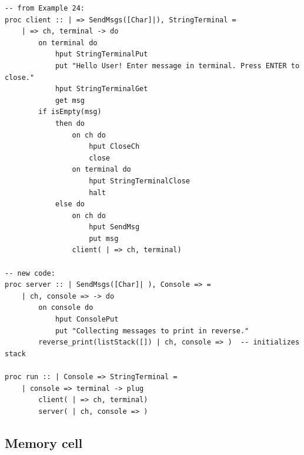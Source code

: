 \documentclass[acmsmall]{acmart}
\begin{document}
\begin{appendix}
\begin{lstlisting}
-- from Example 24:
proc client :: | => SendMsgs([Char]|), StringTerminal =
	| => ch, terminal -> do
		on terminal do	
			hput StringTerminalPut
			put "Hello User! Enter message in terminal. Press ENTER to close."
			hput StringTerminalGet
			get msg
		if isEmpty(msg)
			then do
				on ch do 
					hput CloseCh
					close 
				on terminal do
					hput StringTerminalClose	
					halt 
			else do
				on ch do											
					hput SendMsg
					put msg
				client( | => ch, terminal)

-- new code:
proc server :: | SendMsgs([Char]| ), Console => =
	| ch, console => -> do
		on console do
			hput ConsolePut
			put "Collecting messages to print in reverse."
		reverse_print(listStack([]) | ch, console => )	-- initializes stack

proc run :: | Console => StringTerminal = 
    | console => terminal -> plug
        client( | => ch, terminal)
        server( | ch, console => )
\end{lstlisting}


\subsection{Memory cell}
\label{prog:mem-cell}


\end{appendix}
\end{document}
